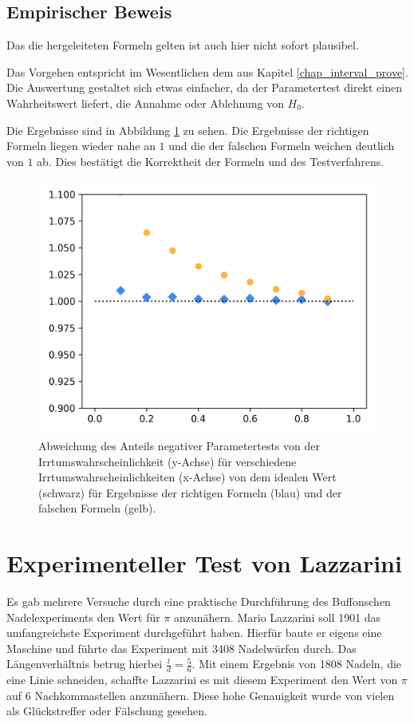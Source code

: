 \documentclass[10pt,twocolumn]{scrartcl}
\begin{document}
	\subsection{Empirischer Beweis}
		Das die hergeleiteten Formeln gelten ist auch hier nicht sofort plausibel.

		Das Vorgehen entspricht im Wesentlichen dem aus Kapitel \ref{chap_interval_prove}. Die Auswertung gestaltet sich etwas einfacher, da der Parametertest direkt einen Wahrheitswert liefert, die Annahme oder Ablehnung von $H_0$.

		Die Ergebnisse sind in Abbildung \ref{fig_test_mean_dot} zu sehen. Die Ergebnisse der richtigen Formeln liegen wieder nahe an $1$ und die der falschen Formeln weichen deutlich von $1$ ab. Dies bestätigt die Korrektheit der Formeln und des Testverfahrens.

		\begin{figure}[H]
			\centering
			\includegraphics[width=0.9\columnwidth]{images/mean_test.png}
			\caption{Abweichung des Anteils negativer Parametertests von der Irrtumswahrscheinlichkeit (y-Achse) für verschiedene Irrtumswahrscheinlichkeiten (x-Achse) von dem idealen Wert (schwarz) für Ergebnisse der richtigen Formeln (blau) und der falschen Formeln (gelb).}
			\label{fig_test_mean_dot}
		\end{figure}

\section{Experimenteller Test von Lazzarini}
	Es gab mehrere Versuche durch eine praktische Durchführung des Buffonschen Nadelexperiments den Wert für $\pi$ anzunähern. Mario Lazzarini soll 1901 das umfangreichste Experiment durchgeführt haben. Hierfür baute er eigens eine Maschine und führte das Experiment mit 3408 Nadelwürfen durch. Das Längenverhältnis betrug hierbei ${\tfrac {l}{d}={\tfrac {5}{6}}}$. Mit einem Ergebnis von 1808 Nadeln, die eine Linie schneiden, schaffte Lazzarini es mit diesem Experiment den Wert von $\pi$ auf 6 Nachkommastellen anzunähern. Diese hohe Genauigkeit wurde von vielen als Glückstreffer oder Fälschung gesehen.\cite{Badger}
\end{document}
